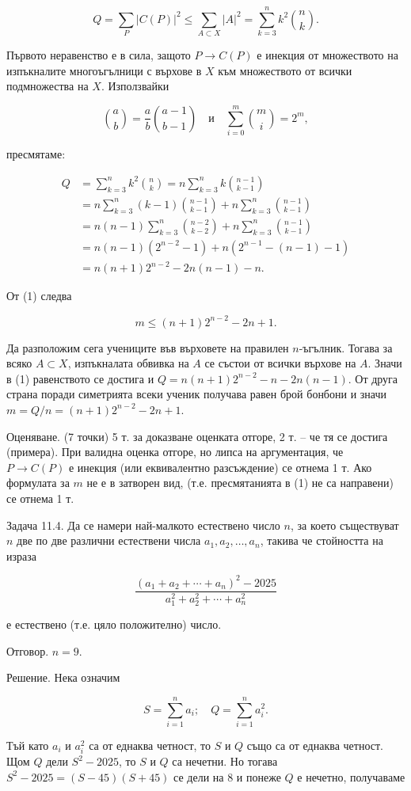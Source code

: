 $$Q=\sum_P|C(P)|^2\leq\sum_{A\subset X}|A|^2=\sum_{k=3}^nk^2\binom nk.$$

Първото неравенство е в сила, защото $P\to C(P)$ е инекция от множеството на изпъкналите многоъгълници с върхове в $X$ към множеството от всички подмножества на $X$. Използвайки

$$\binom ab=\frac ab\binom{a-1}{b-1}\quad\text{и}\quad\sum_{i=0}^m\binom mi=2^m,$$

пресмятаме:

$$
\begin{aligned}
Q&=\sum_{k=3}^nk^2\binom nk=n\sum_{k=3}^nk\binom{n-1}{k-1}\\
&=n\sum_{k=3}^n(k-1)\binom{n-1}{k-1}+n\sum_{k=3}^n\binom{n-1}{k-1}\\
&=n(n-1)\sum_{k=3}^n\binom{n-2}{k-2}+n\sum_{k=3}^n\binom{n-1}{k-1}\\
&=n(n-1)(2^{n-2}-1)+n(2^{n-1}-(n-1)-1)\\
&=n(n+1)2^{n-2}-2n(n-1)-n.\tag{1}
\end{aligned}
$$

От (1) следва

$$m\leq(n+1)2^{n-2}-2n+1.$$

Да разположим сега учениците във върховете на правилен $n$-ъгълник. Тогава за всяко $A\subset X$, изпъкналата обвивка на $A$ се състои от всички върхове на $A$. Значи в (1) равенството се достига и $Q=n(n+1)2^{n-2}-n-2n(n-1)$. От друга страна поради симетрията всеки ученик получава равен брой бонбони и значи $m=Q/n=(n+1)2^{n-2}-2n+1$.

Оценяване. (7 точки) 5 т. за доказване оценката отгоре, 2 т. – че тя се достига (примера). При валидна оценка отгоре, но липса на аргументация, че $P\to C(P)$ е инекция (или еквивалентно разсъждение) се отнема 1 т. Ако формулата за $m$ не е в затворен вид, (т.е. пресмятанията в (1) не са направени) се отнема 1 т.

Задача 11.4. Да се намери най-малкото естествено число $n$, за което съществуват $n$ две по две различни естествени числа $a_1,a_2,\ldots,a_n$, такива че стойността на израза

$$\frac{(a_1+a_2+\cdots+a_n)^2-2025}{a_1^2+a_2^2+\cdots+a_n^2}$$

е естествено (т.е. цяло положително) число.

Отговор. $n=9$.

Решение. Нека означим

$$S=\sum_{i=1}^na_i;\quad Q=\sum_{i=1}^na_i^2.$$

Тъй като $a_i$ и $a_i^2$ са от еднаква четност, то $S$ и $Q$ също са от еднаква четност. Щом $Q$ дели $S^2-2025$, то $S$ и $Q$ са нечетни. Но тогава $S^2-2025=(S-45)(S+45)$ се дели на 8 и понеже $Q$ е нечетно, получаваме

